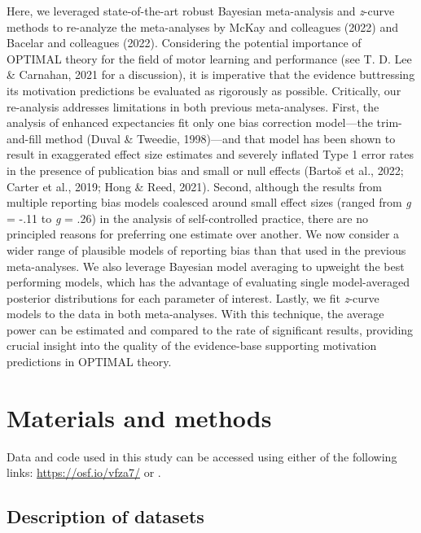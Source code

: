 \documentclass[
  man, donotrepeattitle,mask,floatsintext]{apa7}
\begin{document}
Here, we leveraged state-of-the-art robust Bayesian meta-analysis and \emph{z}-curve methods to re-analyze the meta-analyses by McKay and colleagues (2022) and Bacelar and colleagues (2022). Considering the potential importance of OPTIMAL theory for the field of motor learning and performance (see T. D. Lee \& Carnahan, 2021 for a discussion), it is imperative that the evidence buttressing its motivation predictions be evaluated as rigorously as possible. Critically, our re-analysis addresses limitations in both previous meta-analyses. First, the analysis of enhanced expectancies fit only one bias correction model---the trim-and-fill method (Duval \& Tweedie, 1998)---and that model has been shown to result in exaggerated effect size estimates and severely inflated Type 1 error rates in the presence of publication bias and small or null effects (Bartoš et al., 2022; Carter et al., 2019; Hong \& Reed, 2021). Second, although the results from multiple reporting bias models coalesced around small effect sizes (ranged from \emph{g} = -.11 to \emph{g} = .26) in the analysis of self-controlled practice, there are no principled reasons for preferring one estimate over another. We now consider a wider range of plausible models of reporting bias than that used in the previous meta-analyses. We also leverage Bayesian model averaging to upweight the best performing models, which has the advantage of evaluating single model-averaged posterior distributions for each parameter of interest. Lastly, we fit \emph{z}-curve models to the data in both meta-analyses. With this technique, the average power can be estimated and compared to the rate of significant results, providing crucial insight into the quality of the evidence-base supporting motivation predictions in OPTIMAL theory.

\hypertarget{materials-and-methods}{%
\section{Materials and methods}\label{materials-and-methods}}

Data and code used in this study can be accessed using either of the following links: \url{https://osf.io/vfza7/} or .

\hypertarget{description-of-datasets}{%
\subsection{Description of datasets}\label{description-of-datasets}}
\end{document}
